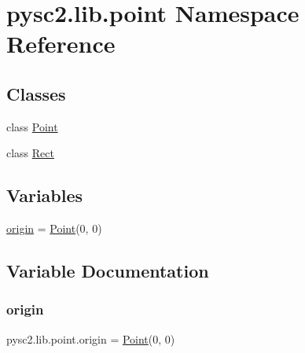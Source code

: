 \hypertarget{namespacepysc2_1_1lib_1_1point}{}\section{pysc2.\+lib.\+point Namespace Reference}
\label{namespacepysc2_1_1lib_1_1point}
\subsection*{Classes}
\begin{DoxyCompactItemize}
\item 
class \mbox{\hyperlink{classpysc2_1_1lib_1_1point_1_1_point}{Point}}
\item 
class \mbox{\hyperlink{classpysc2_1_1lib_1_1point_1_1_rect}{Rect}}
\end{DoxyCompactItemize}
\subsection*{Variables}
\begin{DoxyCompactItemize}
\item 
\mbox{\hyperlink{namespacepysc2_1_1lib_1_1point_a99891351bc447e5e8e500a7566148d4f}{origin}} = \mbox{\hyperlink{classpysc2_1_1lib_1_1point_1_1_point}{Point}}(0, 0)
\end{DoxyCompactItemize}


\subsection{Variable Documentation}
\mbox{\label{namespacepysc2_1_1lib_1_1point_a99891351bc447e5e8e500a7566148d4f}} 
\subsubsection{\texorpdfstring{origin}{origin}}
{\footnotesize\ttfamily pysc2.\+lib.\+point.\+origin = \mbox{\hyperlink{classpysc2_1_1lib_1_1point_1_1_point}{Point}}(0, 0)}

